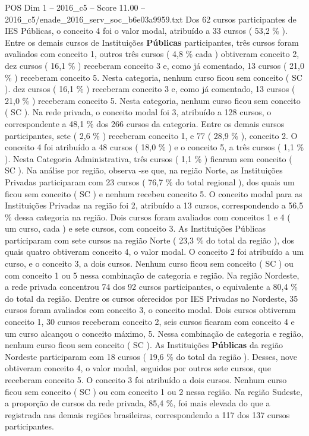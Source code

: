\begin{textsample}{POS Dim 1 – 2016\_c5 – Score 11.00 – 2016\_c5/enade\_2016\_serv\_soc\_b6e03a9959.txt}
Dos 62 cursos participantes de IES Públicas, o conceito 4 foi o valor modal, atribuído a 33 cursos ( 53,2 \% ).
Entre os demais cursos de Instituições \textbf{Públicas} participantes, três cursos foram avaliados com conceito 1, outros três cursos ( 4,8 \% cada ) obtiveram conceito 2, dez cursos ( 16,1 \% ) receberam conceito 3 e, como já comentado, 13 cursos ( 21,0 \% ) receberam conceito 5.
Nesta categoria, nenhum curso ficou sem conceito ( SC ). dez cursos ( 16,1 \% ) receberam conceito 3 e, como já comentado, 13 cursos ( 21,0 \% ) receberam conceito 5.
Nesta categoria, nenhum curso ficou sem conceito ( SC ).
Na rede privada, o conceito modal foi 3, atribuído a 128 cursos, o correspondente a 48,1 \% dos 266 cursos da categoria.
Entre os demais cursos participantes, sete ( 2,6 \% ) receberam conceito 1, e 77 ( 28,9 \% ), conceito 2.
O conceito 4 foi atribuído a 48 cursos ( 18,0 \% ) e o conceito 5, a três cursos ( 1,1 \% ).
Nesta Categoria Administrativa, três cursos ( 1,1 \% ) ficaram sem conceito ( SC ).
Na análise por região, observa -se que, na região Norte, as Instituições Privadas participaram com 23 cursos ( 76,7 \% do total regional ), dos quais um ficou sem conceito ( SC ) e nenhum recebeu conceito 5.
O conceito modal para as Instituições Privadas na região foi 2, atribuído a 13 cursos, correspondendo a 56,5 \% dessa categoria na região.
Dois cursos foram avaliados com conceitos 1 e 4 ( um curso, cada ) e sete cursos, com conceito 3.
As Instituições Públicas participaram com sete cursos na região Norte ( 23,3 \% do total da região ), dos quais quatro obtiveram conceito 4, o valor modal.
O conceito 2 foi atribuído a um curso, e o conceito 3, a dois cursos.
Nenhum curso ficou sem conceito ( SC ) ou com conceito 1 ou 5 nessa combinação de categoria e região.
Na região Nordeste, a rede privada concentrou 74 dos 92 cursos participantes, o equivalente a 80,4 \% do total da região.
Dentre os cursos oferecidos por IES Privadas no Nordeste, 35 cursos foram avaliados com conceito 3, o conceito modal.
Dois cursos obtiveram conceito 1, 30 cursos receberam conceito 2, seis cursos ficaram com conceito 4 e um curso alcançou o conceito máximo, 5.
Nessa combinação de categoria e região, nenhum curso ficou sem conceito ( SC ).
As Instituições \textbf{Públicas} da região Nordeste participaram com 18 cursos ( 19,6 \% do total da região ).
Desses, nove obtiveram conceito 4, o valor modal, seguidos por outros sete cursos, que receberam conceito 5.
O conceito 3 foi atribuído a dois cursos.
Nenhum curso ficou sem conceito ( SC ) ou com conceito 1 ou 2 nessa região.
Na região Sudeste, a proporção de cursos da rede privada, 85,4 \%, foi mais elevada do que a registrada nas demais regiões brasileiras, correspondendo a 117 dos 137 cursos participantes.

\end{textsample}
